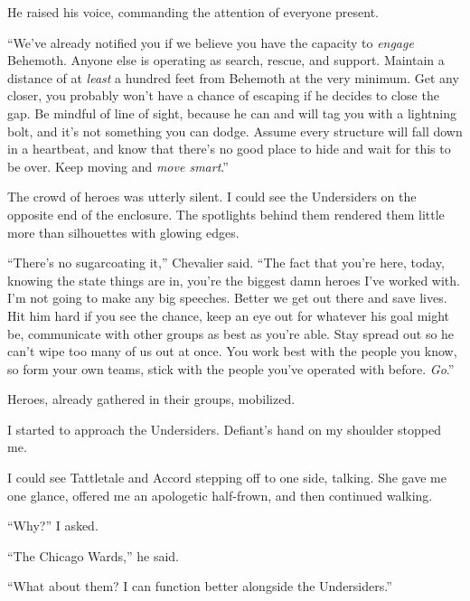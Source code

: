 He raised his voice, commanding the attention of everyone present.



``We've already notified you if we believe you have the capacity to \emph{engage} Behemoth.  Anyone else is operating as search, rescue, and support.  Maintain\emph{ }a distance of at \emph{least} a hundred feet from Behemoth at the very minimum.  Get any closer, you probably won't have a chance of escaping if he decides to close the gap.  Be mindful of line of sight, because he can and will tag you with a lightning bolt, and it's not something you can dodge.  Assume every structure will fall down in a heartbeat, and know that there's no good place to hide and wait for this to be over.  Keep moving and \emph{move smart}.''



The crowd of heroes was utterly silent.  I could see the Undersiders on the opposite end of the enclosure.  The spotlights behind them rendered them little more than silhouettes with glowing edges.



``There's no sugarcoating it,'' Chevalier said.  ``The fact that you're here, today, knowing the state things are in, you're the biggest damn heroes I've worked with.  I'm not going to make any big speeches.  Better we get out there and save lives.  Hit him hard if you see the chance, keep an eye out for whatever his goal might be, communicate with other groups as best as you're able.  Stay spread out so he can't wipe too many of us out at once.  You work best with the people you know, so form your own teams, stick with the people you've operated with before.  \emph{Go}.''



Heroes, already gathered in their groups, mobilized.



I started to approach the Undersiders.  Defiant's hand on my shoulder stopped me.



I could see Tattletale and Accord stepping off to one side, talking.  She gave me one glance, offered me an apologetic half-frown, and then continued walking.



``Why?'' I asked.



``The Chicago Wards,'' he said.



``What about them?  I can function better alongside the Undersiders.''




